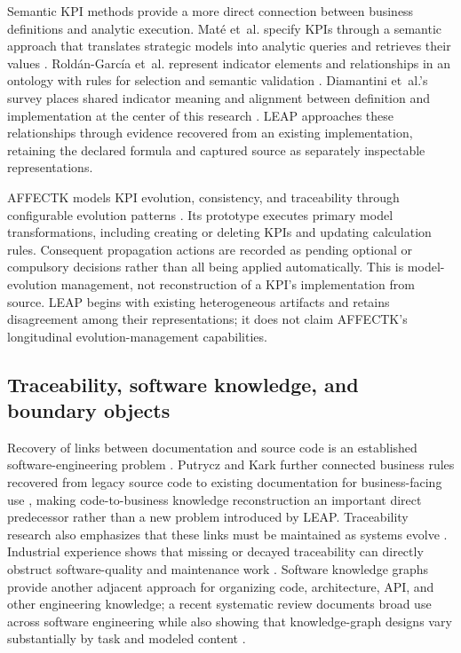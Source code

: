 \documentclass[a4paper,fleqn]{cas-dc}
\begin{document}
Semantic KPI methods provide a more direct connection between business definitions and analytic execution. Mat\'e et~al. specify KPIs through a semantic approach that translates strategic models into analytic queries and retrieves their values \citep{Mate2017}. Rold\'an-Garc\'ia et~al. represent indicator elements and relationships in an ontology with rules for selection and semantic validation \citep{RoldanGarcia2021}. Diamantini et~al.'s survey places shared indicator meaning and alignment between definition and implementation at the center of this research \citep{Diamantini2025}. LEAP approaches these relationships through evidence recovered from an existing implementation, retaining the declared formula and captured source as separately inspectable representations.

AFFECTK models KPI evolution, consistency, and traceability through configurable evolution patterns \citep{Dominguez2025}. Its prototype executes primary model transformations, including creating or deleting KPIs and updating calculation rules. Consequent propagation actions are recorded as pending optional or compulsory decisions rather than all being applied automatically. This is model-evolution management, not reconstruction of a KPI's implementation from source. LEAP begins with existing heterogeneous artifacts and retains disagreement among their representations; it does not claim AFFECTK's longitudinal evolution-management capabilities.

\subsection{Traceability, software knowledge, and boundary objects}

Recovery of links between documentation and source code is an established software-engineering problem \citep{Marcus2005}. Putrycz and Kark further connected business rules recovered from legacy source code to existing documentation for business-facing use \citep{PutryczKark2008}, making code-to-business knowledge reconstruction an important direct predecessor rather than a new problem introduced by LEAP. Traceability research also emphasizes that these links must be maintained as systems evolve \citep{MaderGotel2012}. Industrial experience shows that missing or decayed traceability can directly obstruct software-quality and maintenance work \citep{Fucci2022}. Software knowledge graphs provide another adjacent approach for organizing code, architecture, API, and other engineering knowledge; a recent systematic review documents broad use across software engineering while also showing that knowledge-graph designs vary substantially by task and modeled content \citep{Wang2023}.
\end{document}
